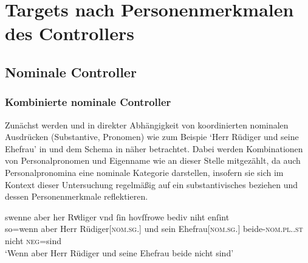 
\section{Targets nach Personenmerkmalen des Controllers}
\label{sec:caotargpers}

\subsection{Nominale Controller}
\subsubsection{Kombinierte nominale Controller}
\label{subsubsec:perscombsgnp}

Zunächst werden  und  in direkter Abhängigkeit von
koordinierten nominalen Ausdrücken (Substantive, Pronomen) wie
zum Beispie  `Herr Rüdiger und seine
Ehefrau' in  und dem Schema in
 näher betrachtet. Dabei werden Kombinationen von
Personalpronomen und Eigenname wie  an dieser Stelle
mitgezählt, da auch Personalpronomina eine nominale Kategorie darstellen,
insofern sie sich im Kontext dieser Untersuchung regelmäßig auf ein
substantivisches  beziehen und dessen Personenmerkmale
reflektieren.

\begin{exe}
\ex \label{ex:beid2coordncao1}
		\gll swenne aber her Rvͦdiger vnd ſin
			hovſfrowe bediv niht enſint\\
			so=wenn aber Herr Rüdiger[\textsc{nom.sg.\MascM}] und sein
			Ehefrau[\textsc{nom.sg.\FemF}] beide-\textsc{nom.pl.\NeutMF.st} nicht
			\textsc{neg}=sind\\
			\trans `Wenn aber Herr Rüdiger und seine Ehefrau
				beide nicht  sind'
				\parencites(Nr.~3262, Regensburg, 1299)[425,13--14]{cao4}
\end{exe}

